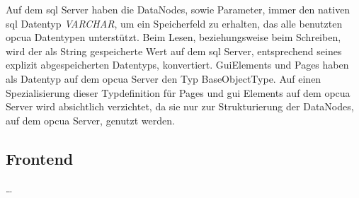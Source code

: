 Auf dem \ac{sql} Server haben die DataNodes, sowie Parameter, immer den nativen \ac{sql} Datentyp \emph{VARCHAR}, um ein Speicherfeld zu erhalten, das alle benutzten \ac{opcua} Datentypen unterstützt.
Beim Lesen, beziehungsweise beim Schreiben, wird der als String gespeicherte Wert auf dem \ac{sql} Server, 
entsprechend seines explizit abgespeicherten Datentyps, konvertiert. 
GuiElements und Pages haben als Datentyp auf dem \ac{opcua} Server den Typ BaseObjectType.
Auf einen Spezialisierung dieser Typdefinition für Pages und \ac{gui} Elements auf dem \ac{opcua} Server wird absichtlich verzichtet, 
da sie nur zur Strukturierung der DataNodes, auf dem \ac{opcua} Server, genutzt werden.


\subsection{Frontend}\label{subsec:dataFrontend}
\dots



